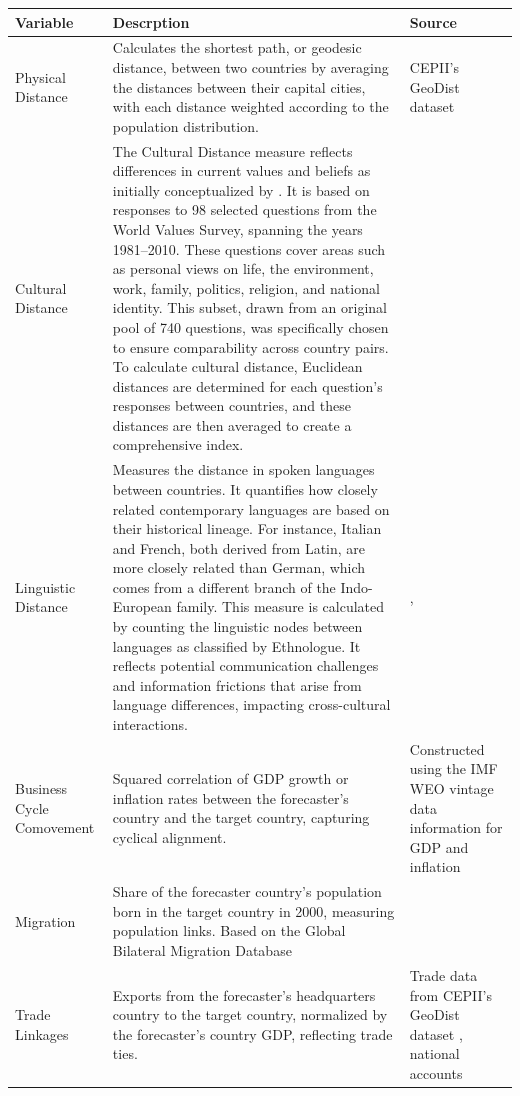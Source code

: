 \documentclass[letterpaper,12pt]{article}
\begin{document}
{\begin{table}[H]
{\begin{tabularx}{\linewidth}{p{2cm} p{10cm} p{4cm}}
			\toprule
			{Variable}&{Descrption}&{Source} \tabularnewline
			\hline
			\midrule \addlinespace[0pt]
			Physical Distance & Calculates the shortest path, or geodesic distance, between two countries by averaging the distances between their capital cities, with each distance weighted according to the population distribution.  & CEPII's GeoDist dataset \citep{Mayer2011} \tabularnewline
			Cultural Distance & The Cultural Distance measure reflects differences in current values and beliefs as initially conceptualized by  \citet{Spolaore2016}. It is based on responses to 98 selected questions from the World Values Survey, spanning the years 1981–2010. These questions cover areas such as personal views on life, the environment, work, family, politics, religion, and national identity. This subset, drawn from an original pool of 740 questions, was specifically chosen to ensure comparability across country pairs. To calculate cultural distance, Euclidean distances are determined for each question’s responses between countries, and these distances are then averaged to create a comprehensive index.  & \citet{Spolaore2016} \tabularnewline
			Linguistic Distance & Measures the distance in spoken languages between countries. It quantifies how closely related contemporary languages are based on their historical lineage. For instance, Italian and French, both derived from Latin, are more closely related than German, which comes from a different branch of the Indo-European family. This measure is calculated by counting the linguistic nodes between languages as classified by Ethnologue. It reflects potential communication challenges and information frictions that arise from language differences, impacting cross-cultural interactions.& \citet{Fearon2003}, \citet{Spolaore2016} \tabularnewline
			Business Cycle Comovement & Squared correlation of GDP growth or inflation rates between the forecaster's country and the target country, capturing cyclical alignment. & Constructed using the IMF WEO vintage data information for GDP and inflation \tabularnewline
			Migration & Share of the forecaster country's population born in the target country in 2000,  measuring population links.  Based on the Global Bilateral Migration Database &  \cite{ozden2011earth} \tabularnewline %
			Trade Linkages & Exports from the forecaster's headquarters country to the target country, normalized by the forecaster's country GDP,  reflecting trade ties. & Trade data from CEPII's GeoDist dataset \citep{Mayer2011}, national accounts \tabularnewline

\end{tabularx}}
\end{table}}
\end{document}
